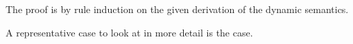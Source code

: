 \begin{nproof}
  The proof is by rule induction on the given derivation of the dynamic semantics.

  A representative case to look at in more detail is the \dcase{} case.




\end{nproof}
